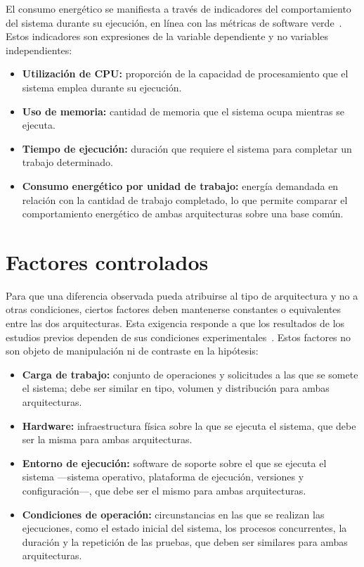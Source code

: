 El consumo energético se manifiesta a través de indicadores del comportamiento del sistema durante su ejecución, en línea con las métricas de software verde~\cite{kipp2011green,kipp2012layered}. Estos indicadores son expresiones de la variable dependiente y no variables independientes:
\begin{itemize}
  \item \textbf{Utilización de CPU:} proporción de la capacidad de procesamiento que el sistema emplea durante su ejecución.
  \item \textbf{Uso de memoria:} cantidad de memoria que el sistema ocupa mientras se ejecuta.
  \item \textbf{Tiempo de ejecución:} duración que requiere el sistema para completar un trabajo determinado.
  \item \textbf{Consumo energético por unidad de trabajo:} energía demandada en relación con la cantidad de trabajo completado, lo que permite comparar el comportamiento energético de ambas arquitecturas sobre una base común.
\end{itemize}

\section{Factores controlados}
\label{sec:factores}

Para que una diferencia observada pueda atribuirse al tipo de arquitectura y no a otras condiciones, ciertos factores deben mantenerse constantes o equivalentes entre las dos arquitecturas. Esta exigencia responde a que los resultados de los estudios previos dependen de sus condiciones experimentales~\cite{araujo2024energy}. Estos factores no son objeto de manipulación ni de contraste en la hipótesis:
\begin{itemize}
  \item \textbf{Carga de trabajo:} conjunto de operaciones y solicitudes a las que se somete el sistema; debe ser similar en tipo, volumen y distribución para ambas arquitecturas.
  \item \textbf{Hardware:} infraestructura física sobre la que se ejecuta el sistema, que debe ser la misma para ambas arquitecturas.
  \item \textbf{Entorno de ejecución:} software de soporte sobre el que se ejecuta el sistema ---sistema operativo, plataforma de ejecución, versiones y configuración---, que debe ser el mismo para ambas arquitecturas.
  \item \textbf{Condiciones de operación:} circunstancias en las que se realizan las ejecuciones, como el estado inicial del sistema, los procesos concurrentes, la duración y la repetición de las pruebas, que deben ser similares para ambas arquitecturas.
\end{itemize}

